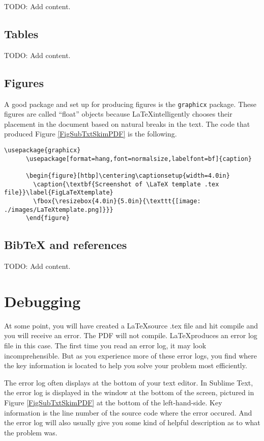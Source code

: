     TODO: Add content.

  \subsection{Tables}

    TODO: Add content.

  \subsection{Figures}

    A good package and set up for producing figures is the \texttt{graphicx} package. These figures are called ``float'' objects because \LaTeX intelligently chooses their placement in the document based on natural breaks in the text. The code that produced Figure \ref{FigSubTxtSkimPDF} is the following.

    \begin{lstlisting}[frame=single]
      \usepackage{graphicx}
      \usepackage[format=hang,font=normalsize,labelfont=bf]{caption}

      \begin{figure}[htbp]\centering\captionsetup{width=4.0in}
        \caption{\textbf{Screenshot of \LaTeX template .tex file}}\label{FigLaTeXtemplate}
        \fbox{\resizebox{4.0in}{5.0in}{\texttt{[image: ./images/LaTeXtemplate.png]}}}
      \end{figure}
    \end{lstlisting}


  \subsection{BibTeX and references}

    TODO: Add content.


\section{Debugging}\label{SecLaTeXDebug}

  At some point, you will have created a \LaTeX source .tex file and hit compile and you will receive an error. The PDF will not compile. \LaTeX produces an error log file in this case. The first time you read an error log, it may look incomprehensible. But as you experience more of these error logs, you find where the key information is located to help you solve your problem most efficiently.

  The error log often displays at the bottom of your text editor. In Sublime Text, the error log is displayed in the window at the bottom of the screen, pictured in Figure \ref{FigSubTxtSkimPDF} at the bottom of the left-hand-side. Key information is the line number of the source code where the error occured. And the error log will also usually give you some kind of helpful description as to what the problem was.

